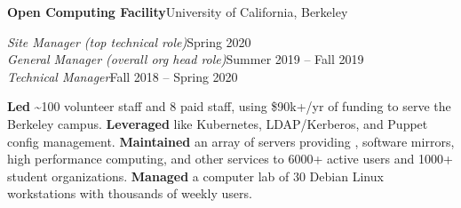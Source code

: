   \vspace{5pt}
  \textbf{Open Computing Facility}\quad{}\hfill University of California, Berkeley
  \begin{adjustwidth}{10pt}{}
    \emph{Site Manager (top technical role)}\hfill Spring 2020\\
    \emph{General Manager (overall org head role)}\hfill Summer 2019 -- Fall 2019\\
    \emph{Technical Manager}\hfill Fall 2018 -- Spring 2020

    \textbf{Led} \textasciitilde{}100 volunteer staff and 8 paid staff, using \$90k+/yr of funding to serve the Berkeley campus.
    \textbf{Leveraged}  like Kubernetes, LDAP/Kerberos, and Puppet config management.
    \textbf{Maintained} an array of servers providing , software mirrors, high performance computing, and other services to 6000+ active users and 1000+ student organizations.
    \textbf{Managed} a computer lab of 30 Debian Linux workstations with thousands of weekly users.

  \end{adjustwidth}






